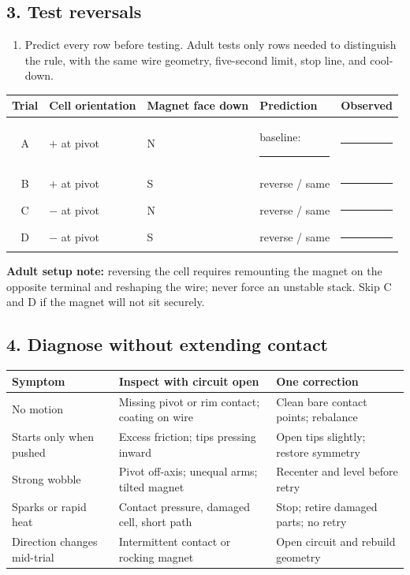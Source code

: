 {\subsection{3. Test reversals}
\begin{enumerate}[resume]
\item Predict every row before testing. Adult tests only rows needed to distinguish the rule, with the same wire geometry, five-second limit, stop line, and cool-down.
\end{enumerate}
\begin{center}\small
\begin{tabular}{@{}clllc@{}}\toprule
Trial & Cell orientation & Magnet face down & Prediction & Observed\\\midrule
A & \(+\) at pivot & N & baseline: \rule{1.0cm}{.3pt} & \rule{1.0cm}{.3pt}\\
B & \(+\) at pivot & S & reverse / same & \rule{1.0cm}{.3pt}\\
C & \(-\) at pivot & N & reverse / same & \rule{1.0cm}{.3pt}\\
D & \(-\) at pivot & S & reverse / same & \rule{1.0cm}{.3pt}\\
\bottomrule
\end{tabular}
\end{center}
\textbf{Adult setup note:} reversing the cell requires remounting the magnet on
the opposite terminal and reshaping the wire; never force an unstable stack.
Skip C and D if the magnet will not sit securely.

\subsection{4. Diagnose without extending contact}
\begin{tabularx}{\linewidth}{@{}>{\RaggedRight\arraybackslash}p{.19\linewidth}>{\RaggedRight\arraybackslash}p{.31\linewidth}L@{}}
\toprule
Symptom & Inspect with circuit open & One correction\\\midrule
No motion & Missing pivot or rim contact; coating on wire & Clean bare contact points; rebalance\\
Starts only when pushed & Excess friction; tips pressing inward & Open tips slightly; restore symmetry\\
Strong wobble & Pivot off-axis; unequal arms; tilted magnet & Recenter and level before retry\\
Sparks or rapid heat & Contact pressure, damaged cell, short path & Stop; retire damaged parts; no retry\\
Direction changes mid-trial & Intermittent contact or rocking magnet & Open circuit and rebuild geometry\\
\bottomrule
\end{tabularx}
}
